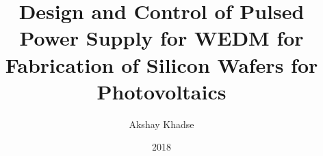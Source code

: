 \documentclass[twoside]{template/iitbreport}
\begin{document}
	
\setcounter{page}{1}

\title{Design and Control of Pulsed Power Supply for WEDM for Fabrication of Silicon Wafers for Photovoltaics}
\author{Akshay Khadse}


\date{2018}










\maketitle



\end{document}
